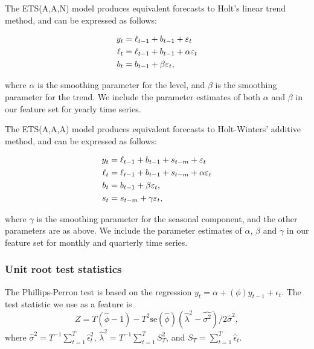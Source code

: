 \documentclass[11pt,a4paper,]{article}
\theoremstyle{definition}
\theoremstyle{definition}
\theoremstyle{definition}
\theoremstyle{remark}
\begin{document}
The ETS(A,A,N) model \autocite{expsmooth08} produces equivalent
forecasts to Holt's linear trend method, and can be expressed as
follows:\vspace*{-.9cm}

\begin{align*}
  y_t    & = \ell_{t-1}+b_{t-1}+\varepsilon_t\\
  \ell_t & = \ell_{t-1}+b_{t-1}+\alpha \varepsilon_t\\
  b_t    & = b_{t-1}+\beta \varepsilon_t,\vspace*{-0.99cm}
\end{align*}

where \(\alpha\) is the smoothing parameter for the level, and \(\beta\)
is the smoothing parameter for the trend. We include the parameter
estimates of both \(\alpha\) and \(\beta\) in our feature set for yearly
time series.

The ETS(A,A,A) model \autocite{expsmooth08} produces equivalent
forecasts to Holt-Winters' additive method, and can be expressed as
follows:\vspace*{-.9cm}

\begin{align*}
  y_t    & = \ell_{t-1}+b_{t-1}+s_{t-m}+\varepsilon_t\\
  \ell_t & = \ell_{t-1}+b_{t-1}+s_{t-m}+\alpha \varepsilon_t\\
  b_t    & = b_{t-1}+\beta \varepsilon_t,\\
  s_t &= s_{t-m} + \gamma\varepsilon_t,\vspace*{-0.99cm}
\end{align*}

where \(\gamma\) is the smoothing parameter for the seasonal component,
and the other parameters are as above. We include the parameter
estimates of \(\alpha\), \(\beta\) and \(\gamma\) in our feature set for
monthly and quarterly time series.

\subsubsection*{Unit root test
statistics}\label{unit-root-test-statistics}

The Phillips-Perron test is based on the regression
\(y_t=\alpha+(\phi)y_{t-1}+ \epsilon_t\). The test statistic we use as a
feature is \[
  Z = T(\hat{\phi}-1)- T^2\text{se}(\hat{\phi})(\hat{\lambda}^2-\hat{\sigma^2})/2\hat\sigma^2,
\] where \(\hat\sigma^2= T^{-1}\sum_{t=1}^{T} \hat\epsilon_t^2\),
\(\hat\lambda^2=T^{-1} \sum_{t=1}^{T} S_T^2\), and
\(S_T = \sum_{t=1}^{T}\hat\epsilon_t\).
\end{document}
